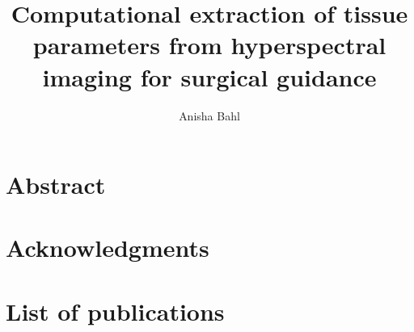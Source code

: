 \documentclass[british,a4paper,11pt,twoside]{StyleThese}
\title{Computational extraction of tissue parameters from hyperspectral imaging for surgical guidance}\let\thetitle\@title
\author{Anisha Bahl}\let\theauthor\@author
\begin{document}
\frontmatter


%

\dominitoc

\copyrightpage{\the\year}{\theauthor}
\declarationpage{\theauthor}

\cleardoublepage
\chapter{Abstract}



\cleardoublepage
\chapter{Acknowledgments}


\cleardoublepage
\chapter*{List of publications}


\cleardoublepage
\tableofcontents

\clearpage
\listoftables
\clearpage
\listoffigures

\mainmatter













\backmatter

\clearpage
{}


 
\end{document}
